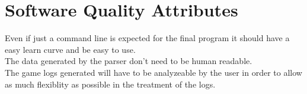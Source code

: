\documentclass{scrreprt}
\begin{document}
\section{Software Quality Attributes}
Even if just a command line is expected for the final program it should have a
easy learn curve and be easy to use.\\
The data generated by the parser don't need to be human readable.\\
The game logs generated will have to be analyzeable by the user in order to allow as much flexiblity as possible in the treatment of the logs.


\end{document}
